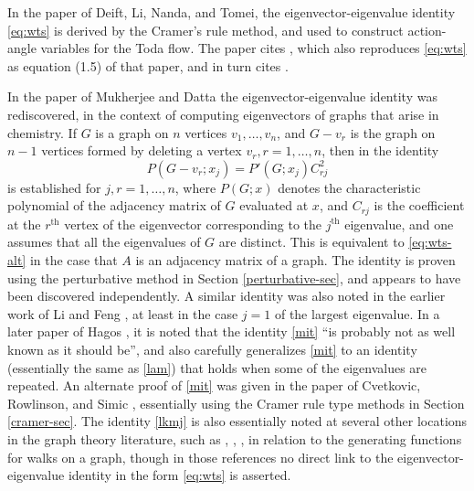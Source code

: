 \documentclass{amsart}
\begin{document}
In the paper \cite[page 210]{DLNT} of Deift, Li, Nanda, and Tomei, the eigenvector-eigenvalue identity \eqref{eq:wts} is derived by the Cramer's rule method, and used to construct action-angle variables for the Toda flow.  The paper cites \cite{BG}, which also reproduces \eqref{eq:wts} as equation (1.5) of that paper, and in turn cites \cite{golub1973}.

In the paper of Mukherjee and Datta \cite{Mukherjee1989} the eigenvector-eigenvalue identity was rediscovered, in the context of computing eigenvectors of graphs that arise in chemistry.  If $G$ is a graph on $n$ vertices $v_1,\dots,v_n$, and $G - v_r$ is the graph on $n-1$ vertices formed by deleting a vertex $v_r, r=1,\dots,n$, then in \cite[(4)]{Mukherjee1989} the identity
\begin{equation}\label{mit}
 P(G - v_r; x_j) = P'(G; x_j) C^2_{rj}
\end{equation}
is established for $j,r=1,\dots,n$, where $P(G;x)$ denotes the characteristic polynomial of the adjacency matrix of $G$ evaluated at $x$, and $C_{rj}$ is the coefficient at the $r^{\mathrm{th}}$ vertex of the eigenvector corresponding to the $j^{\mathrm{th}}$ eigenvalue, and one assumes that all the eigenvalues of $G$ are distinct.  This is equivalent to \eqref{eq:wts-alt} in the case that $A$ is an adjacency matrix of a graph.  The identity is proven using the perturbative method in Section \ref{perturbative-sec}, and appears to have been discovered independently.  A similar identity was also noted in the earlier work of Li and Feng \cite{LF}, at least in the case $j=1$ of the largest eigenvalue.
In a later paper of Hagos \cite{HAGOS2002103}, it is noted that the identity \eqref{mit} ``is probably not as well known as it should be'', and also carefully generalizes \eqref{mit} to an identity (essentially the same as \eqref{lam}) that holds when some of the eigenvalues are repeated.  An alternate proof of \eqref{mit} was given in the paper of Cvetkovic, Rowlinson, and Simic \cite[Theorem 3.1]{CVETKOVIC2007146}, essentially using the Cramer rule type methods in Section \ref{cramer-sec}. The identity \eqref{lkmj} is also essentially noted at several other locations in the graph theory literature, such as \cite[Chapter 4]{godsil-book}, \cite[Lemma 2.1]{GK}, \cite[Lemma 7.1, Corollary 7.2]{godsil}, \cite[(2)]{GGKL} in relation to the generating functions for walks on a graph, though in those references no direct link to the eigenvector-eigenvalue identity in the form \eqref{eq:wts} is asserted.
\end{document}
